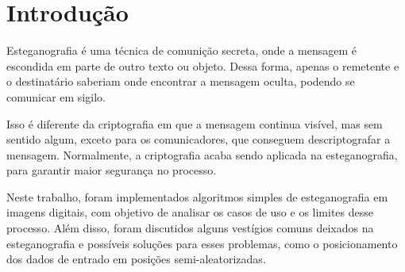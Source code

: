 \section{Introdução} \label{sec:introducao}

Esteganografia é uma técnica de comunição secreta, onde a mensagem é escondida em parte de outro texto ou objeto. Dessa forma, apenas o remetente e o destinatário saberiam onde encontrar a mensagem oculta, podendo se comunicar em sigilo.


Isso é diferente da criptografia em que a mensagem continua visível, mas sem sentido algum, exceto para os comunicadores, que conseguem descriptografar a mensagem. Normalmente, a criptografia acaba sendo aplicada na esteganografia, para garantir maior segurança no processo.

Neste trabalho, foram implementados algoritmos simples de esteganografia em imagens digitais, com objetivo de analisar os casos de uso e os limites desse processo. Além disso, foram discutidos alguns vestígios comuns deixados na esteganografia e possíveis soluções para esses problemas, como o posicionamento dos dados de entrado em posições semi-aleatorizadas.
